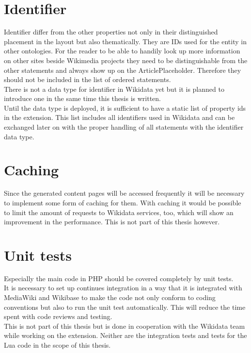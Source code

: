 \section {Identifier}
Identifier differ from the other properties not only in their distinguished placement in the layout but also thematically. They are IDs used for the entity in other ontologies. For the reader to be able to handily look up more information on other sites beside Wikimedia projects they need to be distinguishable from the other statements and always show up on the ArticlePlaceholder. Therefore they should not be included in the list of ordered statements. \\
There is not a data type for identifier in Wikidata yet but it is planned to introduce one in the same time this thesis is written. \\
Until the data type is deployed, it is sufficient to have a static list of property ids in the extension. This list includes all identifiers used in Wikidata and can be exchanged later on with the proper handling of all statements with the identifier data type.

\section{Caching}
Since the generated content pages will be accessed frequently  it will be necessary to implement some form of caching for them. With caching it would be possible to limit the amount of requests to Wikidata services, too, which will show an improvement in the performance. This is not part of this thesis however.

\section {Unit tests}
Especially the main code in PHP should be covered completely by unit tests. \\
It is necessary to set up continues integration in a way that it is integrated with MediaWiki and Wikibase to make the code not only conform to coding conventions but also to run the unit test automatically. This will reduce the time spent with code reviews and testing. \\
This is not part of this thesis but is done in cooperation with the Wikidata team while working on the extension. Neither are the integration tests and tests for the Lua code in the scope of this thesis. \\ 